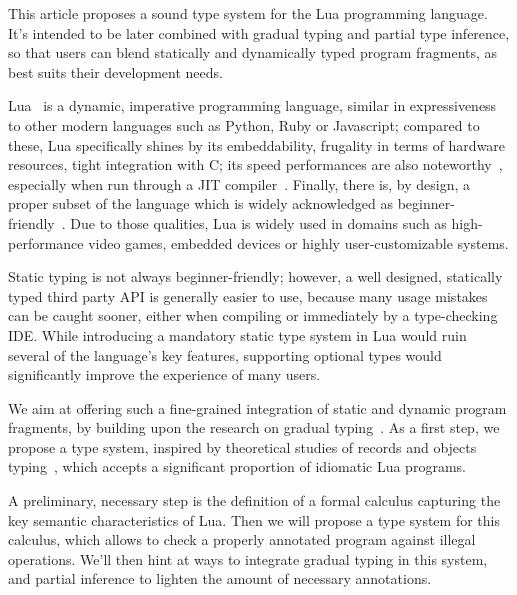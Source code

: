
This article proposes a sound type system for the Lua programming
language. It's intended to be later combined with gradual typing and
partial type inference, so that users can blend statically and
dynamically typed program fragments, as best suits their development
needs.

Lua~\cite{lua} is a dynamic, imperative programming language, similar
in expressiveness to other modern languages such as Python, Ruby or
Javascript; compared to these, Lua specifically shines by its
embeddability, frugality in terms of hardware resources, tight
integration with C; its speed performances are also
noteworthy~\cite{perf-lua}, especially when run through a JIT
compiler~\cite{perf-luajit}. Finally, there is, by design, a proper
subset of the language which is widely acknowledged as
beginner-friendly~\cite{usability-ms}. Due to those qualities, Lua is
widely used in domains such as high-performance video games, embedded
devices or highly user-customizable systems.

Static typing is not always beginner-friendly; however, a well
designed, statically typed third party API is generally easier to use,
because many usage mistakes can be caught sooner, either when
compiling or immediately by a type-checking IDE. While introducing a
mandatory static type system in Lua would ruin several of the
language's key features, supporting optional types would significantly
improve the experience of many users.

We aim at offering such a fine-grained integration of static and
dynamic program fragments, by building upon the research on gradual
typing~\cite{gradual}. As a first step, we propose a type system,
inspired by theoretical studies of records and objects
typing~\cite{remy,sigma}, which accepts a significant proportion of
idiomatic Lua programs.

A preliminary, necessary step is the definition of a formal calculus
capturing the key semantic characteristics of Lua. Then we will
propose a type system for this calculus, which allows to check a
properly annotated program against illegal operations. We'll then hint
at ways to integrate gradual typing in this system, and partial
inference to lighten the amount of necessary annotations.
